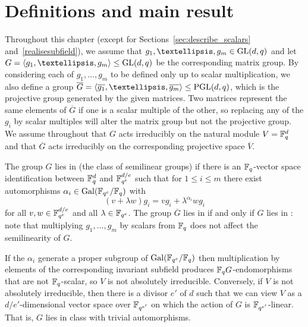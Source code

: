 \section{Definitions and main result}\label{sec:defns}

Throughout this chapter (except for Sections~\ref{sec:describe_scalars}    
and~\ref{realisesubfield}), we assume that                              
$g_1, \ldots, g_m \in \GL(d,q)$ 
and let $G = \left< g_1, \ldots,
g_m\right> \le \GL(d,q)$ be the corresponding matrix 
group. By considering each of $g_1, \ldots, g_m$ to be 
defined only up to scalar multiplication, we also 
define a group $\overline G = 
\left< \overline{g_1}, \ldots, \overline{g_m} \right> \leq
\PGL(d,q)$, which is the projective group generated by 
the given matrices. Two matrices represent the same elements of $\overline{G}$ 
if one is a scalar multiple of the other, 
so replacing any of the $g_i$ by scalar multiples will 
alter the matrix group but not the projective group.
We assume throughout that $G$ acts irreducibly on the natural
module $V = \mathbb{F}_q^d$ and that $\overline{G}$ acts irreducibly
on the corresponding projective space $\overline{V}$.


\begin{Def} \label{def:semilin}
The group $G$ lies in  (the class of semilinear groups) 
if there is an $\mathbb{F}_q$-vector space identification between
$\mathbb{F}_q^d$ and $\mathbb{F}_{q^e}^{d/e}$ such that
for $1 \le i \le m$ 
there exist automorphisms $\alpha_i \in \Gal(\F_{q^e}/\F_q)$ 
with \[(v+\lambda
w)g_i = v  g_i + \lambda^{\alpha_i}  w  g_i\] for
all $v,w \in \mathbb{F}_{q^e}^{d/e}$ and all $\lambda \in \mathbb{F}_{q^e}$.
 The 
group $\overline{G}$ lies in  if and only if $G$ lies in : 
note that multiplying $g_1, \ldots, g_m$ by scalars from $\mathbb{F}_q$ 
does not affect the semilinearity of $G$. 
\end{Def}

If the $\alpha_i$ generate a proper subgroup
of $\Gal(\F_{q^e}/\F_q)$ then
multiplication by elements of the corresponding invariant 
subfield produces $\mathbb{F}_qG$-endomorphisms that are not $\mathbb{F}_q$-scalar, so $V$ 
is not absolutely irreducible.
Conversely, if $V$ is not absolutely irreducible, then
there is a divisor $e'$ of $d$ 
such that we can view $V$ as a $d/e'$-dimensional vector space
over $\mathbb{F}_{q^{e'}}$ on which the action of $G$
is $\mathbb{F}_{q^{e'}}$-linear. That is, $G$ lies in class  with
trivial automorphisms.

